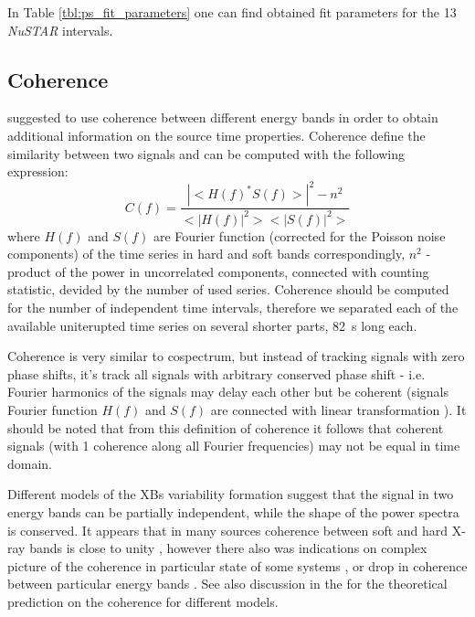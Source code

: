 \documentclass[a4paper,fleqn,usenatbib]{mnras}
\begin{document}
In Table \ref{tbl:ps_fit_parameters} one can find obtained fit parameters for the 13 {\it NuSTAR} intervals.

\subsection{Coherence}

\citep{1997ApJ...474L..43V} suggested to use coherence between different energy bands in order to obtain additional information on the source time properties. 
Coherence define the similarity between two signals and can be computed with the following expression:
\begin{equation}
    C(f) = \frac{|<H(f)^*S(f)>|^2 - n^2}{<|H(f)|^2><|S(f)|^2>}
    \label{eq:nowak_coh}
\end{equation}
where $H(f)$ and $S(f)$ are Fourier function (corrected for the Poisson noise components) of the time series in hard and soft bands correspondingly, 
$n^2$ - product of the power in uncorrelated components, connected with counting statistic, devided by the number of used series. 
Coherence should be computed for the number of independent time intervals, therefore we separated each of the available uniterupted time series on several shorter parts, 82~s long each.  


Coherence is very similar to cospectrum, but instead of tracking signals with zero phase shifts, it's track all signals with arbitrary conserved phase shift - i.e. Fourier harmonics of the signals may delay each other but be coherent (signals Fourier function $H(f)$ and $S(f)$ are connected with linear transformation \citep{1997ApJ...474L..43V}).
It should be noted that from this definition of coherence it follows that coherent signals (with 1 coherence along all Fourier frequencies) may not be equal in time domain. 

Different models of the XBs variability formation suggest that the signal in two energy bands can be partially independent, while the shape of the power spectra is conserved.
It appears that in many sources coherence between soft and hard X-ray bands is close to unity \citep{1999ApJ...517..355N, 1999ApJ...514..939W}, however there also was indications on complex picture of the coherence in particular state of some systems \citep{2003ApJ...584L..23J}, or drop in coherence between particular energy bands \citep[see, GX 339--4 result in][]{1997ApJ...474L..43V}.
See also discussion in the \citep{1997ApJ...474L..43V} for the theoretical prediction on the coherence for different models.
\end{document}
